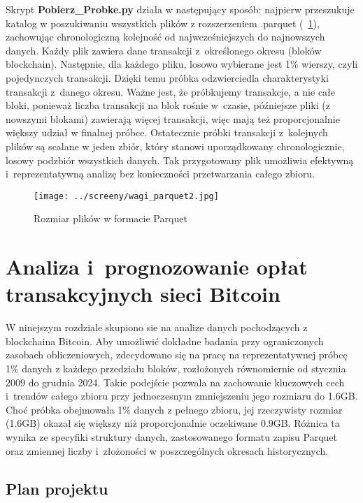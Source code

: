\documentclass[12pt,a4paper]{report}
\theoremstyle{definition} %
\begin{document}
	Skrypt \textbf{Pobierz\_Probke.py} działa w następujący sposób: najpierw przeszukuje katalog w poszukiwaniu wszystkich plików z rozszerzeniem .parquet (\figurename~\ref{fig:rozmiarParquet}), zachowując chronologiczną kolejność od najwcześniejszych do najnowszych danych. Każdy plik zawiera dane transakcji z~określonego okresu (bloków blockchain). Następnie, dla każdego pliku, losowo wybierane jest 1\% wierszy, czyli pojedynczych transakcji. Dzięki temu próbka odzwierciedla charakterystyki transakcji z~danego okresu. Ważne jest, że próbkujemy transakcje, a nie całe bloki, ponieważ liczba transakcji na blok rośnie w~czasie, późniejsze pliki (z nowszymi blokami) zawierają więcej transakcji, więc mają też proporcjonalnie większy udział w finalnej próbce. Ostatecznie próbki transakcji z~kolejnych plików są scalane w jeden zbiór, który stanowi uporządkowany chronologicznie, losowy podzbiór wszystkich danych. Tak przygotowany plik umożliwia efektywną i~reprezentatywną analizę bez konieczności przetwarzania całego zbioru.

	\begin{figure}[H]
	    \centering
	    \texttt{[image: ../screeny/wagi\_parquet2.jpg]} 
	    \caption{Rozmiar plików w formacie Parquet}
	    \label{fig:rozmiarParquet}
	\end{figure}

	\chapter{Analiza i~prognozowanie opłat transakcyjnych sieci Bitcoin}
	\hspace*{\parindent}W ninejszym rozdziale skupiono sie na analize danych pochodzących z blockchaina Bitcoin. Aby umożliwić dokładne badania przy ograniczonych zasobach obliczeniowych, zdecydowano się na pracę na reprezentatywnej próbcę 1\% danych z każdego przedziału bloków, rozłożonych równomiernie od stycznia 2009 do grudnia 2024. 		Takie podejście pozwala na zachowanie kluczowych cech i~trendów całego zbioru przy jednoczesnym zmniejszeniu jego rozmiaru do 1.6GB. Choć próbka obejmowała 1\% danych z pełnego zbioru, jej rzeczywisty rozmiar (1.6GB) okazał się większy niż proporcjonalnie oczekiwane 0.9GB. Różnica ta wynika ze specyfiki struktury danych, zastosowanego formatu zapisu Parquet oraz zmiennej liczby i~złożoności w poszczególnych okresach historycznych.

	\section{Plan projektu}
\end{document}
